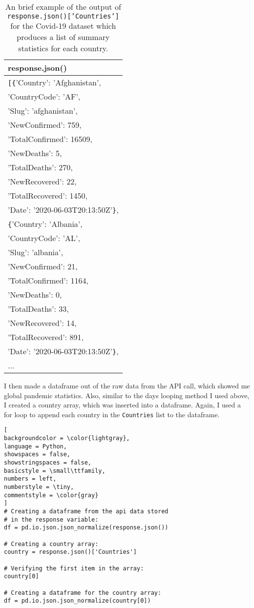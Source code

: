 \documentclass[]{article}
\newcommand{\code}[1]{\colorbox{light-gray}{\texttt{#1}}}
\begin{document}
\begin{table}[!ht]
	\begin{center}
		\caption{An brief example of the output of \code{response.json()['Countries']} for the Covid-19 dataset which produces a list of summary statistics for each country.}
		\label{tab:table1}
		\begin{tabular}{|l|} 
			\hline
			\textbf{response.json()} \\
			\hline
			\verb|[{|'Country': 'Afghanistan',\\
				'CountryCode': 'AF',\\
				'Slug': 'afghanistan',\\
				'NewConfirmed': 759,\\
				'TotalConfirmed': 16509,\\
				'NewDeaths': 5,\\
				'TotalDeaths': 270,\\
				'NewRecovered': 22,\\
				'TotalRecovered': 1450,\\
				'Date': '2020-06-03T20:13:50Z'\verb|}|,\\
			\verb|{|'Country': 'Albania',\\
				'CountryCode': 'AL',\\
				'Slug': 'albania',\\
				'NewConfirmed': 21,\\
				'TotalConfirmed': 1164,\\
				'NewDeaths': 0,\\
				'TotalDeaths': 33,\\
				'NewRecovered': 14,\\
				'TotalRecovered': 891,\\
				'Date': '2020-06-03T20:13:50Z'\verb|}|,\\
				...\\
			
			\hline
		\end{tabular}
	\end{center}
\end{table}

I then made a dataframe out of the raw data from the API call, which showed me global pandemic statistics.  Also, similar to the days looping method I used above, I created a country array, which was inserted into a dataframe.  Again, I used a for loop to append each country in the \code{Countries} list to the dataframe. 

\begin{lstlisting}[
backgroundcolor = \color{lightgray},
language = Python,
showspaces = false,
showstringspaces = false,
basicstyle = \small\ttfamily,
numbers = left,
numberstyle = \tiny,
commentstyle = \color{gray}
]
# Creating a dataframe from the api data stored
# in the response variable:
df = pd.io.json.json_normalize(response.json())

# Creating a country array:
country = response.json()['Countries']

# Verifying the first item in the array:
country[0]

# Creating a dataframe for the country array:
df = pd.io.json.json_normalize(country[0])
\end{lstlisting}
\end{document}
